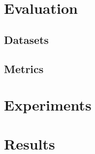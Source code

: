 \label{chap:results}



\section{Evaluation}   

\subsection{Datasets}
\subsection{Metrics}


\section{Experiments}


\section{Results}      


